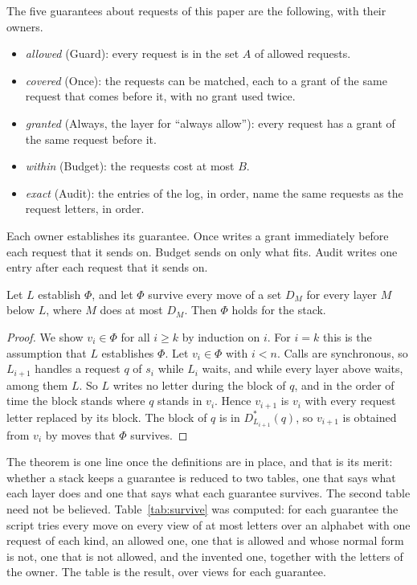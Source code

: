 \documentclass[acmsmall,nonacm,screen]{acmart}
\newcommand{\ly}[1]{\textsf{#1}}
\newcommand{\clos}[2]{#1^{*}(#2)}
\newcommand{\claim}[2]{#2}
\begin{document}
The five guarantees about requests of this paper are the following, with their owners.
\begin{itemize}
\item \emph{allowed} (\ly{Guard}): every request is in the set $A$ of allowed requests.
\item \emph{covered} (\ly{Once}): the requests can be matched, each to a grant of the same
  request that comes before it, with no grant used twice.
\item \emph{granted} (\ly{Always}, the layer for ``always allow''): every request has a
  grant of the same request before it.
\item \emph{within} (\ly{Budget}): the requests cost at most $B$.
\item \emph{exact} (\ly{Audit}): the entries of the log, in order, name the same requests as
  the request letters, in order.
\end{itemize}
Each owner establishes its guarantee. \ly{Once} writes a grant immediately before each
request that it sends on. \ly{Budget} sends on only what fits. \ly{Audit} writes one entry
after each request that it sends on.

\begin{theorem}
\label{thm:down}
Let $L$ establish $\Phi$, and let $\Phi$ survive every move of a set $D_M$ for every layer
$M$ below $L$, where $M$ does at most $D_M$. Then $\Phi$ holds for the stack.
\end{theorem}

\begin{proof}
We show $v_i \in \Phi$ for all $i \ge k$ by induction on $i$. For $i = k$ this is the
assumption that $L$ establishes $\Phi$. Let $v_i \in \Phi$ with $i < n$. Calls are
synchronous, so $L_{i+1}$ handles a request $q$ of $s_i$ while $L_i$ waits, and while every
layer above waits, among them $L$. So $L$ writes no letter during the block of $q$, and in
the order of time the block stands where $q$ stands in $v_i$. Hence $v_{i+1}$ is $v_i$ with
every request letter replaced by its block. The block of $q$ is in $\clos{D_{L_{i+1}}}{q}$,
so $v_{i+1}$ is obtained from $v_i$ by moves that $\Phi$ survives.
\end{proof}

The theorem is one line once the definitions are in place, and that is its merit: whether a
stack keeps a guarantee is reduced to two tables, one that says what each layer does and one
that says what each guarantee survives. The second table need not be believed.
Table~\ref{tab:survive} was computed: for each guarantee the script tries every move on every
view of at most \exStreamLength{} letters over an alphabet with one request of each kind, an
allowed one, one that is allowed and whose normal form is not, one that is not allowed, and
the invented one, together with the letters of the owner. \claim{survive-table}{The table is
the result}, over \exStreams{} views for each guarantee.
\end{document}
